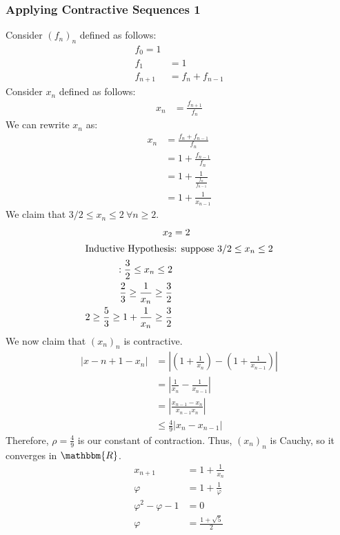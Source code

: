 \documentclass[10pt]{extarticle}
\newcommand{\R}{\mathbbm{R}}
\begin{document}
    \subsubsection{Applying Contractive Sequences 1}%
    Consider $(f_n)_n$ defined as follows:
    \begin{align*}
      f_0 = 1\\
      f_1 &= 1\\
      f_{n+1} &= f_n + f_{n-1}
    \end{align*}
    Consider $x_n$ defined as follows:
    \begin{align*}
      x_n &= \frac{f_{n+1}}{f_n}
    \end{align*}
    We can rewrite $x_n$ as:
    \begin{align*}
      x_n &= \frac{f_n + f_{n-1}}{f_n}\\
          &= 1 + \frac{f_{n-1}}{f_n}\\
          &= 1 + \frac{1}{\frac{f_n}{f_{n-1}}}\\
          &= 1 + \frac{1}{x_{n-1}}
    \end{align*}
    We claim that $3/2 \leq x_n \leq 2~\forall n\geq 2$.
    \begin{align*}
      x_2 &= 2\\
      \shortintertext{Inductive Hypothesis: suppose $3/2 \leq x_n \leq 2$}:
      \frac{3}{2} \leq x_n \leq 2\\
      \frac{2}{3} \geq \frac{1}{x_n} \geq \frac{3}{2}\\
      2 \geq \frac{5}{3} \geq 1 + \frac{1}{x_n} \geq \frac{3}{2}
    \end{align*}
    We now claim that $(x_n)_n$ is contractive.
    \begin{align*}
      \left|x-{n+1}-x_n\right| &= \left|\left(1+\frac{1}{x_n}\right) - \left(1 + \frac{1}{x_{n-1}}\right)\right|\\
                               &= \left|\frac{1}{x_{n}} - \frac{1}{x_{n-1}}\right|\\
                               &= \left|\frac{x_{n-1}-x_{n}}{x_{n-1}x_{n}}\right|\\
                               &\leq \frac{4}{9} |x_{n}-x_{n-1}|
    \end{align*}
    Therefore, $\rho = \frac{4}{9}$ is our constant of contraction. Thus, $(x_n)_n$ is Cauchy, so it converges in $\R$.
    \begin{align*}
      x_{n+1} &= 1 + \frac{1}{x_{n}}\tag{$n \rightarrow \infty,~x_n \rightarrow \varphi$}\\
      \varphi &= 1 + \frac{1}{\varphi}\\
      \varphi^2 - \varphi - 1 &= 0\\
      \varphi &= \frac{1 + \sqrt{5}}{2}
    \end{align*}
\end{document}
